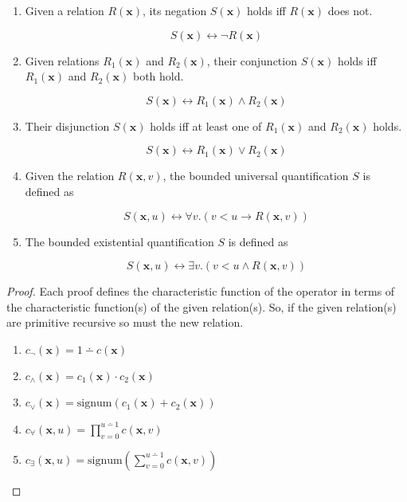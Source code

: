 \begin{enumerate}
    \item Given a relation $R(\mathbf{x})$, its negation
    $S(\mathbf{x})$ holds iff $R(\mathbf{x})$ does not.
    
    $$S(\mathbf{x}) \leftrightarrow \neg R(\mathbf{x})$$
    
    \item Given relations $R_1(\mathbf{x})$ and
    $R_2(\mathbf{x})$, their conjunction $S(\mathbf{x})$ holds iff
    $R_1(\mathbf{x})$ and $R_2(\mathbf{x})$ both hold.
    
    $$S(\mathbf{x}) \leftrightarrow R_1(\mathbf{x}) \wedge R_2(\mathbf{x})$$
    
    \item Their disjunction $S(\mathbf{x})$ holds iff
    at least one of $R_1(\mathbf{x})$ and $R_2(\mathbf{x})$ holds.
    
    $$S(\mathbf{x}) \leftrightarrow R_1(\mathbf{x}) \vee R_2(\mathbf{x})$$
    
    \item Given the relation $R(\mathbf{x}, v)$, the bounded universal 
    quantification $S$ is defined as
    
    $$S(\mathbf{x}, u) \leftrightarrow \forall v. (v < u \rightarrow 
    R(\mathbf{x}, v))$$
    
    \item The bounded existential quantification $S$ is defined as
    
    $$S(\mathbf{x}, u) \leftrightarrow \exists v. (v < u  \wedge 
    R(\mathbf{x}, v))$$
\end{enumerate}

\begin{proof} 
Each proof defines the characteristic function of the operator in 
terms of the characteristic function(s) of the given relation(s). So, if the
given relation(s) are primitive recursive so must the new relation.

    \begin{enumerate}
        \item $c_{\neg}(\mathbf{x}) = 1 \dotminus c(\mathbf{x})$
        \item $c_{\wedge}(\mathbf{x}) = c_1(\mathbf{x}) \cdot c_2(\mathbf{x})$
        \item $c_{\vee}(\mathbf{x}) = \mathrm{signum}(c_1(\mathbf{x}) + 
        c_2(\mathbf{x}))$
        \item $c_{\forall}(\mathbf{x}, u) = \prod^{u \dotminus 1}_{v = 0} 
        c(\mathbf{x}, 
        v)$
        \item $c_{\exists}(\mathbf{x}, u) = \mathrm{signum}\left( \sum^{u 
        \dotminus 1}_{v = 0} c(\mathbf{x}, v)\right)$
    \end{enumerate}
\end{proof}

